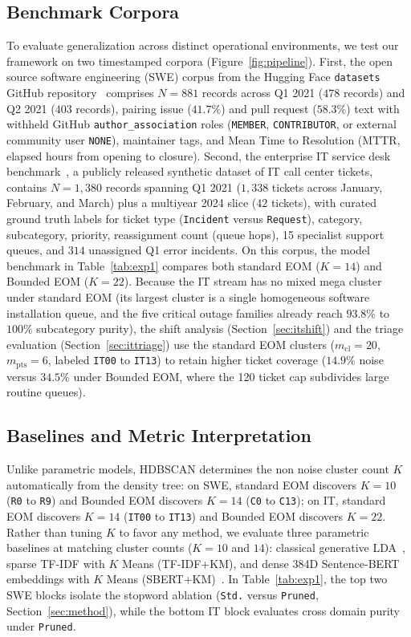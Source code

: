 \documentclass[sigconf,nonacm,pbalance]{acmart}
\begin{document}
\subsection{Benchmark Corpora}
\label{sec:corpora}
To evaluate generalization across distinct operational environments, we test our framework on two timestamped corpora (Figure~\ref{fig:pipeline}). First, the open source software engineering (SWE) corpus from the Hugging Face \texttt{datasets} GitHub repository~\cite{lhoest2021datasets} comprises $N = 881$ records across Q1 2021 ($478$ records) and Q2 2021 ($403$ records), pairing issue ($41.7\%$) and pull request ($58.3\%$) text with withheld GitHub \texttt{author\_association} roles (\texttt{MEMBER}, \texttt{CONTRIBUTOR}, or external community user \texttt{NONE}), maintainer tags, and Mean Time to Resolution (MTTR, elapsed hours from opening to closure). Second, the enterprise IT service desk benchmark~\cite{vogel2024itsm}, a publicly released synthetic dataset of IT call center tickets, contains $N = 1,380$ records spanning Q1 2021 ($1,338$ tickets across January, February, and March) plus a multiyear 2024 slice ($42$ tickets), with curated ground truth labels for ticket type (\texttt{Incident} versus \texttt{Request}), category, subcategory, priority, reassignment count (queue hops), 15 specialist support queues, and $314$ unassigned Q1 error incidents. On this corpus, the model benchmark in Table~\ref{tab:exp1} compares both standard EOM ($K = 14$) and Bounded EOM ($K = 22$). Because the IT stream has no mixed mega cluster under standard EOM (its largest cluster is a single homogeneous software installation queue, and the five critical outage families already reach $93.8\%$ to $100\%$ subcategory purity), the shift analysis (Section~\ref{sec:itshift}) and the triage evaluation (Section~\ref{sec:ittriage}) use the standard EOM clusters ($m_{\text{cl}} = 20$, $m_{\text{pts}} = 6$, labeled \texttt{IT00} to \texttt{IT13}) to retain higher ticket coverage ($14.9\%$ noise versus $34.5\%$ under Bounded EOM, where the 120 ticket cap subdivides large routine queues).

\subsection{Baselines and Metric Interpretation}
Unlike parametric models, HDBSCAN determines the non noise cluster count $K$ automatically from the density tree: on SWE, standard EOM discovers $K = 10$ (\texttt{R0} to \texttt{R9}) and Bounded EOM discovers $K = 14$ (\texttt{C0} to \texttt{C13}); on IT, standard EOM discovers $K = 14$ (\texttt{IT00} to \texttt{IT13}) and Bounded EOM discovers $K = 22$. Rather than tuning $K$ to favor any method, we evaluate three parametric baselines at matching cluster counts ($K = 10$ and $14$): classical generative LDA~\cite{blei2003latent}, sparse TF-IDF with $K$ Means (TF-IDF+KM), and dense 384D Sentence-BERT embeddings with $K$ Means (SBERT+KM)~\cite{reimers2019sentence}. In Table~\ref{tab:exp1}, the top two SWE blocks isolate the stopword ablation (\texttt{Std.} versus \texttt{Pruned}, Section~\ref{sec:method}), while the bottom IT block evaluates cross domain purity under \texttt{Pruned}.
\end{document}
